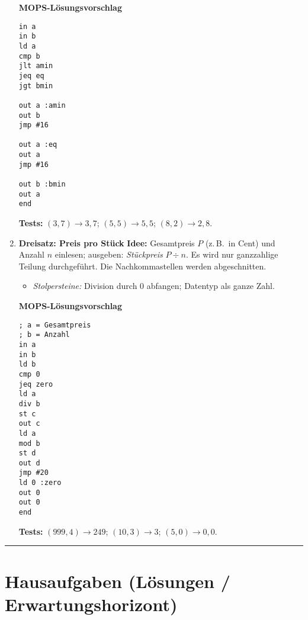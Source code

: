 \documentclass[11pt,a4paper]{scrartcl}
\begin{document}
\begin{enumerate}[leftmargin=*,label=\textbf{Aufgabe~\arabic*:}, itemsep=1.0em]
\textbf{MOPS-Lösungsvorschlag}
\begin{verbatim}
in a
in b
ld a
cmp b
jlt amin
jeq eq
jgt bmin

out a :amin
out b
jmp #16

out a :eq
out a
jmp #16

out b :bmin
out a
end
\end{verbatim}

\textbf{Tests:} $(3,7) \to 3,7$; $(5,5) \to 5,5$; $(8,2) \to 2,8$.

\item \textbf{Dreisatz: Preis pro Stück}\quad
\textbf{Idee:} Gesamtpreis $P$ (z.\,B.\ in Cent) und Anzahl $n$ einlesen; ausgeben: \emph{Stückpreis} $P \div n$. Es wird nur ganzzahlige Teilung durchgeführt. Die Nachkommastellen werden abgeschnitten.
\begin{itemize}
  \item \emph{Stolpersteine:} Division durch 0 abfangen; Datentyp als ganze Zahl.
\end{itemize}

\textbf{MOPS-Lösungsvorschlag}
\begin{verbatim}
; a = Gesamtpreis
; b = Anzahl
in a        
in b        
ld b
cmp 0
jeq zero
ld a
div b
st c
out c
ld a
mod b
st d
out d
jmp #20
ld 0 :zero
out 0
out 0
end
\end{verbatim}

\textbf{Tests:} $(999,4) \to 249$; $(10,3) \to 3$; $(5,0) \to 0, 0$.

\end{enumerate}

\vspace{0.4em}
\hrule
\vspace{0.6em}

\section*{Hausaufgaben (Lösungen / Erwartungshorizont)}
\end{document}
